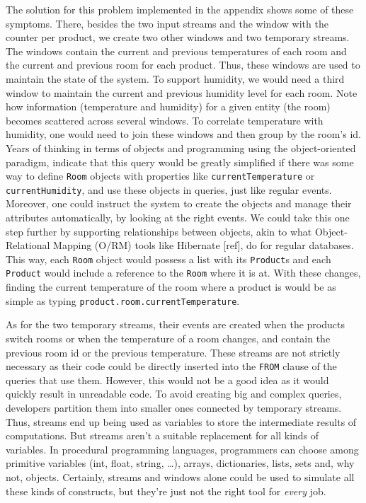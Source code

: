 \documentclass{report}
\begin{document}
The solution for this problem implemented in the appendix shows some
of these symptoms. There, besides the two input streams and the window
with the counter per product, we create two other windows and two
temporary streams. The windows contain the current and previous
temperatures of each room and the current and previous room for each
product. Thus, these windows are used to maintain the state of the
system. To support humidity, we would need a third window to maintain
the current and previous humidity level for each room. Note how
information (temperature and humidity) for a given entity (the room)
becomes scattered across several windows. To correlate temperature
with humidity, one would need to join these windows and then group by
the room's id. Years of thinking in terms of objects and programming
using the object-oriented paradigm, indicate that this query would be
greatly simplified if there was some way to define \verb=Room= objects
with properties like \verb=currentTemperature= or
\verb=currentHumidity=, and use these objects in queries, just like
regular events. Moreover, one could instruct the system to create the
objects and manage their attributes automatically, by looking at the
right events. We could take this one step further by supporting
relationships between objects, akin to what Object-Relational Mapping
(O/RM) tools like Hibernate [ref], do for regular databases. This way,
each \verb=Room= object would possess a list with its \verb=Product=s
and each \verb=Product= would include a reference to the \verb=Room=
where it is at. With these changes, finding the current temperature of
the room where a product is would be as simple as typing
\verb=product.room.currentTemperature=.

As for the two temporary streams, their events are created when the
products switch rooms or when the temperature of a room changes, and
contain the previous room id or the previous temperature. These
streams are not strictly necessary as their code could be directly
inserted into the \verb=FROM= clause of the queries that use
them. However, this would not be a good idea as it would quickly
result in unreadable code. To avoid creating big and complex queries,
developers partition them into smaller ones connected by temporary
streams. Thus, streams end up being used as variables to store the
intermediate results of computations. But streams aren't a suitable
replacement for all kinds of variables. In procedural programming
languages, programmers can choose among primitive variables (int,
float, string, \dots), arrays, dictionaries, lists, sets and, why not,
objects. Certainly, streams and windows alone could be used to
simulate all these kinds of constructs, but they're just not the right
tool for \emph{every} job.
\end{document}
